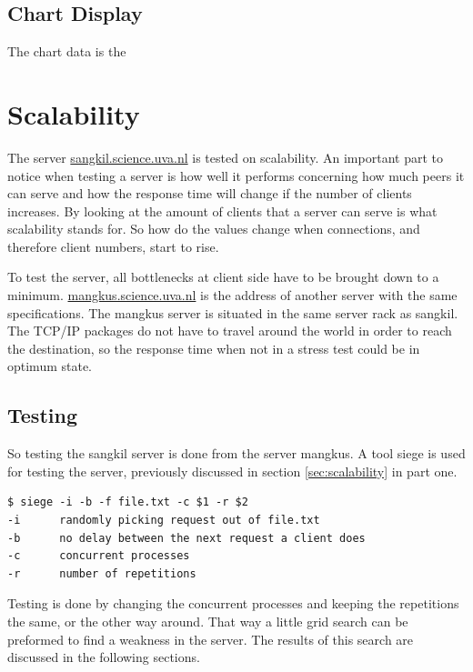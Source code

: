 \subsection{Chart Display}
The chart data is the  
 
\section{Scalability}
The server \url{sangkil.science.uva.nl} is tested on scalability. An important part to notice when testing a server is how well it performs concerning how much peers it can serve and how the response time will change if the number of clients increases. By looking at the amount of clients that a server can serve is what scalability stands for. So how do the values change when connections, and therefore client numbers, start to rise.

To test the server, all bottlenecks at client side have to be brought down to a minimum. \url{mangkus.science.uva.nl} is the address of another server with the same specifications. The mangkus server is situated in the same server rack as sangkil. The TCP/IP packages do not have to travel around the world in order to reach the destination, so the response time when not in a stress test could be in optimum state. 

\subsection{Testing}
So testing the sangkil server is done from the server mangkus. A tool siege is used for testing the server, previously discussed in section \ref{sec:scalability} in part one.
\begin{lstlisting}
$ siege -i -b -f file.txt -c $1 -r $2
-i		randomly picking request out of file.txt
-b		no delay between the next request a client does
-c		concurrent processes
-r		number of repetitions
\end{lstlisting}

Testing is done by changing the concurrent processes and keeping the repetitions the same, or the other way around. That way a little grid search can be preformed to find a weakness in the server. The results of this search are discussed in the following sections. 

